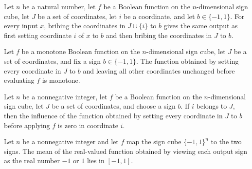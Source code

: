 \begin{theorem}
\label{FABL.bribeFunction_insert}
\leanok
{}
Let $n$ be a natural number, let $f$ be a Boolean function on the $n$-dimensional sign
cube, let $J$ be a set of coordinates, let $i$ be a coordinate, and let $b\in\{-1,1\}$.
For every input $x$, bribing the coordinates in $J\cup\{i\}$ to $b$ gives the same
output as first setting coordinate $i$ of $x$ to $b$ and then bribing the coordinates in
$J$ to $b$.
\end{theorem}

\begin{theorem}
\label{FABL.monotone_bribeFunction}
\leanok
{}
Let $f$ be a monotone Boolean function on the $n$-dimensional sign cube, let $J$ be a
set of coordinates, and fix a sign $b\in\{-1,1\}$. The function obtained by setting
every coordinate in $J$ to $b$ and leaving all other coordinates unchanged before
evaluating $f$ is monotone.
\end{theorem}

\begin{theorem}
\label{FABL.booleanInfluence_bribeFunction_eq_zero_of_mem}
\leanok
{}
Let $n$ be a nonnegative integer, let $f$ be a Boolean function on the $n$-dimensional
sign cube, let $J$ be a set of coordinates, and choose a sign $b$. If $i$ belongs to
$J$, then the influence of the function obtained by setting every coordinate in $J$ to
$b$ before applying $f$ is zero in coordinate $i$.
\end{theorem}

\begin{theorem}
\label{FABL.mean_toReal_mem_Icc}
\leanok
{}
Let $n$ be a nonnegative integer and let $f$ map the sign cube $\{−1,1\}^n$ to the two
signs. The mean of the real-valued function obtained by viewing each output sign as the
real number $-1$ or $1$ lies in $[-1,1]$.
\end{theorem}

